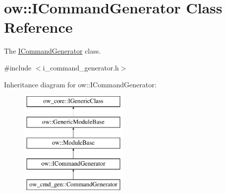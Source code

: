 \hypertarget{classow_1_1ICommandGenerator}{}\section{ow\+:\+:I\+Command\+Generator Class Reference}
\label{classow_1_1ICommandGenerator}


The \hyperlink{classow_1_1ICommandGenerator}{I\+Command\+Generator} class.  




{\ttfamily \#include $<$i\+\_\+command\+\_\+generator.\+h$>$}

Inheritance diagram for ow\+:\+:I\+Command\+Generator\+:\begin{figure}[H]
\begin{center}
\leavevmode
\includegraphics[height=5.000000cm]{df/d70/classow_1_1ICommandGenerator}
\end{center}
\end{figure}
